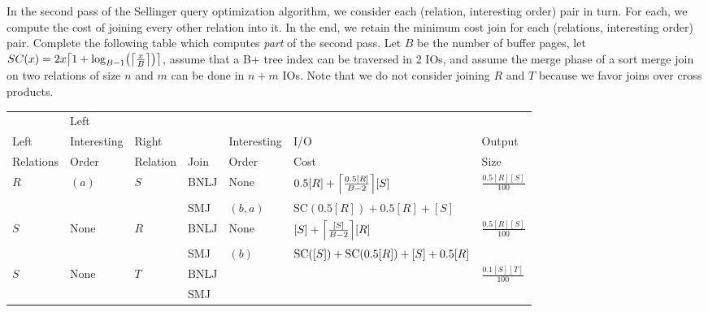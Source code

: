 \documentclass{article}
\newcommand{\sol}[1]{\iftoggle{showsolutions}{\textcolor{red}{#1}}{\phantom{#1}}}
\begin{document}
In the second pass of the Sellinger query optimization algorithm, we consider
each (relation, interesting order) pair in turn. For each, we compute the cost
of joining every other relation into it. In the end, we retain the minimum cost
join for each (relations, interesting order) pair. Complete the following table
which computes \emph{part} of the second pass. Let $B$ be the number of buffer
pages, let $SC(x) = \sortcost{x}$, assume that a B+ tree index can be traversed
in 2 IOs, and assume the merge phase of a sort merge join on two relations of
size $n$ and $m$ can be done in $n + m$ IOs. Note that we do not consider
joining $R$ and $T$ because we favor joins over cross products.
\begin{center}
  \begin{tabular}{|l|l|l|l|l|l|l|}
    \hline
                         & Left                   &                      &      &                &                                       & \\
    Left                 & Interesting            & Right                &      & Interesting    & I/O                                   & Output                                   \\
    Relations            & Order                  & Relation             & Join & Order          & Cost                                  & Size                                     \\\hline
    \multirow{2}{*}{$R$} & \multirow{2}{*}{$(a)$} & \multirow{2}{*}{$S$} & BNLJ & None           & $\bnlj{0.5[R]}{[S]}$                  & \multirow{2}{*}{$\frac{0.5[R][S]}{100}$} \\\cline{4-6}
                         &                        &                      & SMJ  & $(b, a)$       & $\text{SC}(0.5[R]) + 0.5[R] + [S]$    & \\\hline
    \multirow{2}{*}{$S$} & \multirow{2}{*}{None}  & \multirow{2}{*}{$R$} & BNLJ & None           & $\bnlj{[S]}{[R]}$                     & \multirow{2}{*}{$\frac{0.5[R][S]}{100}$} \\\cline{4-6}
                         &                        &                      & SMJ  & $(b)$          & $\text{SC}([S]) + \text{SC}(0.5[R]) + [S] + 0.5[R]$                   & \\\hline
    \multirow{2}{*}{$S$} & \multirow{2}{*}{None}  & \multirow{2}{*}{$T$} & BNLJ & \sol{None}     & \sol{$\bnlj{[S]}{[T]}$}               & \multirow{2}{*}{$\frac{0.1[S][T]}{100}$} \\\cline{4-6}
                         &                        &                      & SMJ  & \sol{$(c)$}    & \sol{$\text{SC}([S]) + [S] + 0.1[T]$} & \\\hline

\end{tabular}
\end{center}
\end{document}
